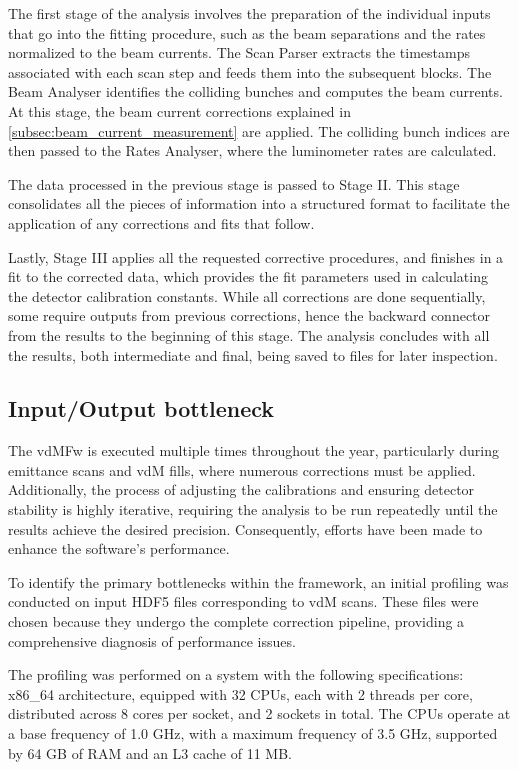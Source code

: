 The first stage of the analysis involves the preparation of the individual inputs that go into the fitting procedure, such as the beam separations and the rates normalized to the beam currents. The Scan Parser extracts the timestamps associated with each scan step and feeds them into the subsequent blocks. The Beam Analyser identifies the colliding bunches and computes the beam currents. At this stage, the beam current corrections explained in \autoref{subsec:beam_current_measurement} are applied. The colliding bunch indices are then passed to the Rates Analyser, where the luminometer rates are calculated.

The data processed in the previous stage is passed to Stage II. This stage consolidates all the pieces of information into a structured format to facilitate the application of any corrections and fits that follow.

Lastly, Stage III applies all the requested corrective procedures, and finishes in a fit to the corrected data, which provides the fit parameters used in calculating the detector calibration constants. While all corrections are done sequentially, some require outputs from previous corrections, hence the backward connector from the results to the beginning of this stage. The analysis concludes with all the results, both intermediate and final, being saved to files for later inspection.

\subsection{Input/Output bottleneck}
\label{subsec:io_bottleneck}

The vdMFw is executed multiple times throughout the year, particularly during emittance scans and vdM fills, where numerous corrections must be applied. Additionally, the process of adjusting the calibrations and ensuring detector stability is highly iterative, requiring the analysis to be run repeatedly until the results achieve the desired precision. Consequently, efforts have been made to enhance the software's performance.

To identify the primary bottlenecks within the framework, an initial profiling was conducted on input HDF5 files corresponding to vdM scans. These files were chosen because they undergo the complete correction pipeline, providing a comprehensive diagnosis of performance issues.

The profiling was performed on a system with the following specifications: x86\_64 architecture, equipped with 32 CPUs, each with 2 threads per core, distributed across 8 cores per socket, and 2 sockets in total. The CPUs operate at a base frequency of 1.0 GHz, with a maximum frequency of 3.5 GHz, supported by 64 GB of RAM and an L3 cache of 11 MB.

